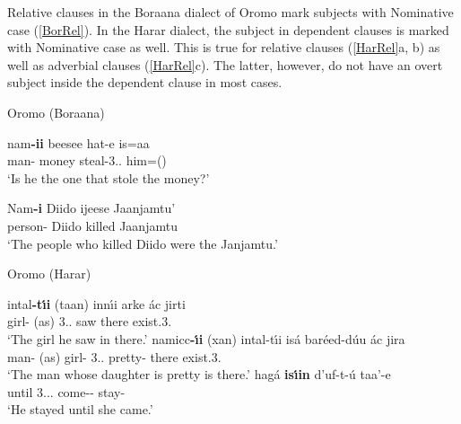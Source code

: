 Relative clauses in the Boraana dialect of Oromo mark subjects with Nominative  case (\ref{BorRel}).
In the Harar dialect, the subject in dependent clauses is marked with Nominative  case as well.
This is true for relative clauses (\ref{HarRel}a, b) as well as adverbial clauses (\ref{HarRel}c). 
The latter, however, do not have an overt subject inside the dependent clause in most cases.

\begin{exe}\ex\label{BorRel} {Oromo (Boraana)} \citetext{Eastern Cushitic; Ethiopia; \citealt[104]{Stroomer:1995}, \citealt[125]{OromoTexts}}\nopagebreak[4]
\begin{xlist}
\ex \gll nam\textbf{-ii} beesee hat-e is=aa\\
man-\nom{} money steal-3\sg{}.\mas{}.\pst{} him=\lin{}(\question{})\\
`Is he the one that stole the money?'

\ex \gll Nam\textbf{-i} Diido ijeese Jaanjamtu'\\
person-\nom{} Diido killed Jaanjamtu\\
`The people who killed Diido were the Janjamtu.' %
\end{xlist}
\end{exe}

\begin{exe} \ex\label{HarRel}  {Oromo (Harar)} \citep[Eastern Cushitic; Ethiopia; ][131, 143]{Owens:1985}\nopagebreak[4]
\begin{xlist}
\ex\gll intal\textbf{-t\'\i i} (taan) inn\'\i i arke \'ac jirti\\
girl-\nom{} (as) 3\sg{}.\mas{}.\nom{} saw there exist.3\sg{}.\fem{}\\
`The girl he saw in there.'
\ex\gll namicc\textbf{-\'\i i} (xan) intal-t\'\i i is\'a bar\'eed-d\'uu \'ac jira\\
man-\nom{} (as) girl-\nom{} 3\sg{}.\mas{}.\acc{} pretty-\fem{} there exist.3\sg{}.\mas{}\\
`The man whose daughter is pretty is there.'
\ex\gll hag\'a \textbf{is\'\i in} d'uf-t-\'u taa'-e\\
until 3.\sg{}.\fem{}.\nom{} come-\fem{}-\dep{} stay-\pst{}\\
`He stayed until she came.'
\end{xlist}
\end{exe} 

